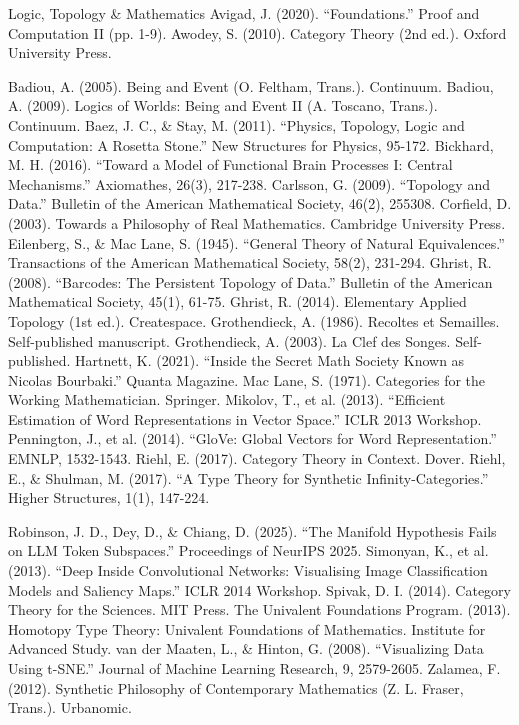 \documentclass[11pt,a4paper,openany]{book}
\begin{document}
Logic, Topology \& Mathematics Avigad, J. (2020). “Foundations.” Proof and Computation II (pp. 1-9). Awodey, S. (2010). Category Theory (2nd ed.). Oxford University Press.

Badiou, A. (2005). Being and Event (O. Feltham, Trans.). Continuum. Badiou, A. (2009). Logics of Worlds: Being and Event II (A. Toscano, Trans.). Continuum. Baez, J. C., \& Stay, M. (2011). “Physics, Topology, Logic and Computation: A Rosetta Stone.” New Structures for Physics, 95-172. Bickhard, M. H. (2016). “Toward a Model of Functional Brain Processes I: Central Mechanisms.” Axiomathes, 26(3), 217-238. Carlsson, G. (2009). “Topology and Data.” Bulletin of the American Mathematical Society, 46(2), 255308. Corfield, D. (2003). Towards a Philosophy of Real Mathematics. Cambridge University Press. Eilenberg, S., \& Mac Lane, S. (1945). “General Theory of Natural Equivalences.” Transactions of the American Mathematical Society, 58(2), 231-294. Ghrist, R. (2008). “Barcodes: The Persistent Topology of Data.” Bulletin of the American Mathematical Society, 45(1), 61-75. Ghrist, R. (2014). Elementary Applied Topology (1st ed.). Createspace. Grothendieck, A. (1986). Recoltes et Semailles. Self-published manuscript. Grothendieck, A. (2003). La Clef des Songes. Self-published. Hartnett, K. (2021). “Inside the Secret Math Society Known as Nicolas Bourbaki.” Quanta Magazine. Mac Lane, S. (1971). Categories for the Working Mathematician. Springer. Mikolov, T., et al. (2013). “Efficient Estimation of Word Representations in Vector Space.” ICLR 2013 Workshop. Pennington, J., et al. (2014). “GloVe: Global Vectors for Word Representation.” EMNLP, 1532-1543. Riehl, E. (2017). Category Theory in Context. Dover. Riehl, E., \& Shulman, M. (2017). “A Type Theory for Synthetic Infinity-Categories.” Higher Structures, 1(1), 147-224.

Robinson, J. D., Dey, D., \& Chiang, D. (2025). “The Manifold Hypothesis Fails on LLM Token Subspaces.” Proceedings of NeurIPS 2025. Simonyan, K., et al. (2013). “Deep Inside Convolutional Networks: Visualising Image Classification Models and Saliency Maps.” ICLR 2014 Workshop. Spivak, D. I. (2014). Category Theory for the Sciences. MIT Press. The Univalent Foundations Program. (2013). Homotopy Type Theory: Univalent Foundations of Mathematics. Institute for Advanced Study. van der Maaten, L., \& Hinton, G. (2008). “Visualizing Data Using t-SNE.” Journal of Machine Learning Research, 9, 2579-2605. Zalamea, F. (2012). Synthetic Philosophy of Contemporary Mathematics (Z. L. Fraser, Trans.). Urbanomic.
\end{document}
